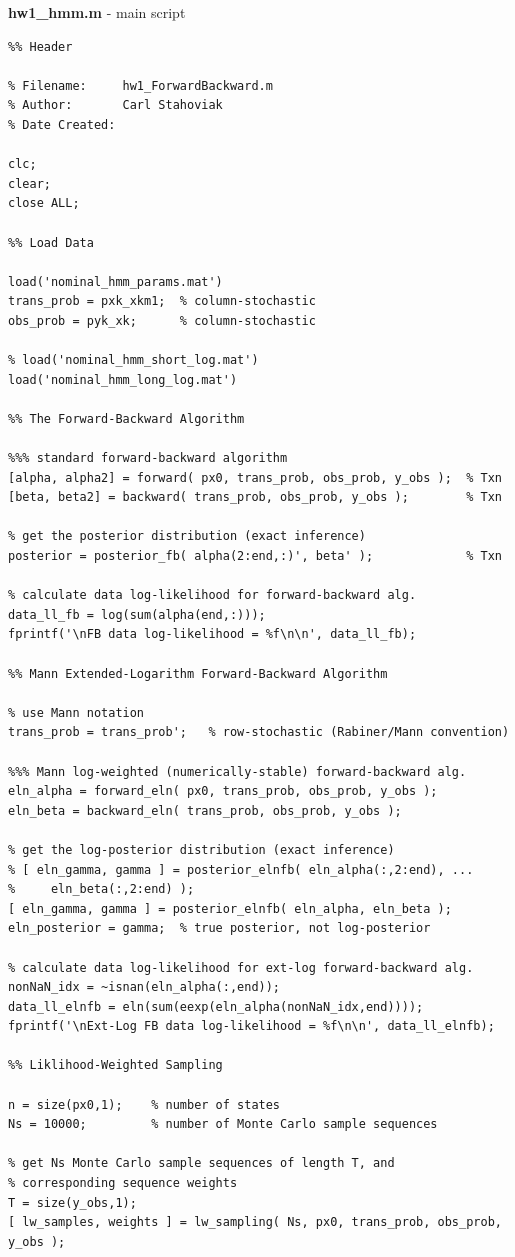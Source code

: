 \documentclass[]{article}
\begin{document}
\textbf{hw1\_hmm.m} - main script
\begin{lstlisting}
%% Header

% Filename:     hw1_ForwardBackward.m
% Author:       Carl Stahoviak
% Date Created:

clc;
clear;
close ALL;

%% Load Data

load('nominal_hmm_params.mat')
trans_prob = pxk_xkm1;  % column-stochastic
obs_prob = pyk_xk;      % column-stochastic

% load('nominal_hmm_short_log.mat')
load('nominal_hmm_long_log.mat')

%% The Forward-Backward Algorithm

%%% standard forward-backward algorithm
[alpha, alpha2] = forward( px0, trans_prob, obs_prob, y_obs );  % Txn
[beta, beta2] = backward( trans_prob, obs_prob, y_obs );        % Txn

% get the posterior distribution (exact inference)
posterior = posterior_fb( alpha(2:end,:)', beta' );             % Txn

% calculate data log-likelihood for forward-backward alg.
data_ll_fb = log(sum(alpha(end,:)));
fprintf('\nFB data log-likelihood = %f\n\n', data_ll_fb);

%% Mann Extended-Logarithm Forward-Backward Algorithm

% use Mann notation
trans_prob = trans_prob';   % row-stochastic (Rabiner/Mann convention)

%%% Mann log-weighted (numerically-stable) forward-backward alg.
eln_alpha = forward_eln( px0, trans_prob, obs_prob, y_obs );
eln_beta = backward_eln( trans_prob, obs_prob, y_obs );

% get the log-posterior distribution (exact inference)
% [ eln_gamma, gamma ] = posterior_elnfb( eln_alpha(:,2:end), ...
%     eln_beta(:,2:end) );
[ eln_gamma, gamma ] = posterior_elnfb( eln_alpha, eln_beta );
eln_posterior = gamma;  % true posterior, not log-posterior

% calculate data log-likelihood for ext-log forward-backward alg.
nonNaN_idx = ~isnan(eln_alpha(:,end));
data_ll_elnfb = eln(sum(eexp(eln_alpha(nonNaN_idx,end))));
fprintf('\nExt-Log FB data log-likelihood = %f\n\n', data_ll_elnfb);

%% Liklihood-Weighted Sampling

n = size(px0,1);    % number of states
Ns = 10000;         % number of Monte Carlo sample sequences

% get Ns Monte Carlo sample sequences of length T, and 
% corresponding sequence weights
T = size(y_obs,1);
[ lw_samples, weights ] = lw_sampling( Ns, px0, trans_prob, obs_prob, y_obs );


\end{lstlisting}
\end{document}
